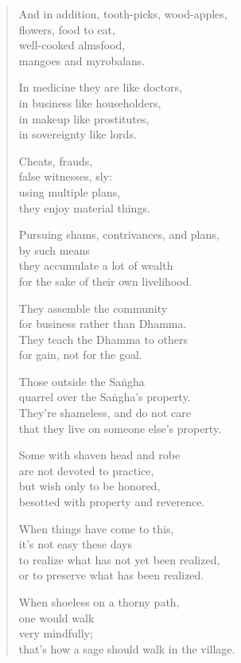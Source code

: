 \documentclass[12pt,openany]{book}%
\begin{document}
\begin{verse}
And in addition, tooth-picks, wood-apples, \\
flowers, food to eat, \\
well-cooked almsfood, \\
mangoes and myrobalans. 

In medicine they are like doctors, \\
in business like householders, \\
in makeup like prostitutes, \\
in sovereignty like lords. 

Cheats, frauds, \\
false witnesses, sly: \\
using multiple plans, \\
they enjoy material things. 

Pursuing shams, contrivances, and plans, \\
by such means \\
they accumulate a lot of wealth \\
for the sake of their own livelihood. 

They assemble the community \\
for business rather than Dhamma. \\
They teach the Dhamma to others \\
for gain, not for the goal. 

Those outside the \textsanskrit{Saṅgha} \\
quarrel over the \textsanskrit{Saṅgha}’s property. \\
They’re shameless, and do not care \\
that they live on someone else’s property. 

Some with shaven head and robe \\
are not devoted to practice, \\
but wish only to be honored, \\
besotted with property and reverence. 

When things have come to this, \\
it’s not easy these days \\
to realize what has not yet been realized, \\
or to preserve what has been realized. 

When shoeless on a thorny path, \\
one would walk \\
very mindfully; \\
that’s how a sage should walk in the village. 


\end{verse}
\end{document}
